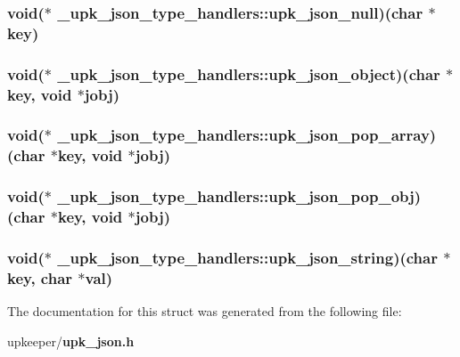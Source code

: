 \subsubsection{\setlength{\rightskip}{0pt plus 5cm}void($\ast$ \bf{\_\-upk\_\-json\_\-type\_\-handlers::upk\_\-json\_\-null})(char $\ast$key)}\label{struct__upk__json__type__handlers_b18e78983503b92d8af8279c8316e29f}


\subsubsection{\setlength{\rightskip}{0pt plus 5cm}void($\ast$ \bf{\_\-upk\_\-json\_\-type\_\-handlers::upk\_\-json\_\-object})(char $\ast$key, void $\ast$jobj)}\label{struct__upk__json__type__handlers_8ae21c83f8a646660cda11e1ea758b09}


\subsubsection{\setlength{\rightskip}{0pt plus 5cm}void($\ast$ \bf{\_\-upk\_\-json\_\-type\_\-handlers::upk\_\-json\_\-pop\_\-array})(char $\ast$key, void $\ast$jobj)}\label{struct__upk__json__type__handlers_4be8aa2e70ef8acf32494281511122fa}


\subsubsection{\setlength{\rightskip}{0pt plus 5cm}void($\ast$ \bf{\_\-upk\_\-json\_\-type\_\-handlers::upk\_\-json\_\-pop\_\-obj})(char $\ast$key, void $\ast$jobj)}\label{struct__upk__json__type__handlers_c1cd94219f954b492bedc11320d1d1b9}


\subsubsection{\setlength{\rightskip}{0pt plus 5cm}void($\ast$ \bf{\_\-upk\_\-json\_\-type\_\-handlers::upk\_\-json\_\-string})(char $\ast$key, char $\ast$val)}\label{struct__upk__json__type__handlers_6eba69b33d9ace1fba39148a6d84b698}




The documentation for this struct was generated from the following file:\begin{CompactItemize}
\item 
upkeeper/\bf{upk\_\-json.h}\end{CompactItemize}

